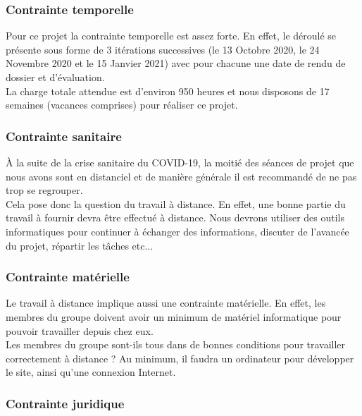 \documentclass[a4paper,11pt]{article}
\begin{document}
\subsubsection{Contrainte temporelle}

Pour ce projet la contrainte temporelle est assez forte. En effet, le déroulé se présente sous forme de
3 itérations successives (le 13 Octobre 2020, le 24 Novembre 2020 et le 15 Janvier 2021) avec pour
chacune une date de rendu de dossier et d’évaluation.\\

La charge totale attendue est d’environ 950 heures et nous disposons de 17 semaines (vacances
comprises) pour réaliser ce projet.\\

\subsubsection{Contrainte sanitaire}

À la suite de la crise sanitaire du COVID-19, la moitié des séances de projet que nous avons sont en
distanciel et de manière générale il est recommandé de ne pas trop se regrouper.\\

Cela pose donc la question du travail à distance. En effet, une bonne partie du travail à fournir devra
être effectué à distance. Nous devrons utiliser des outils informatiques pour continuer à échanger des
informations, discuter de l’avancée du projet, répartir les tâches etc...\\

\subsubsection{Contrainte matérielle}

Le travail à distance implique aussi une contrainte matérielle. En effet, les membres du groupe doivent
avoir un minimum de matériel informatique pour pouvoir travailler depuis chez eux.\\

Les membres du groupe sont-ils tous dans de bonnes conditions pour travailler correctement à
distance ? Au minimum, il faudra un ordinateur pour développer le site, ainsi qu’une connexion
Internet.\\

\subsubsection{Contrainte juridique}
\end{document}
